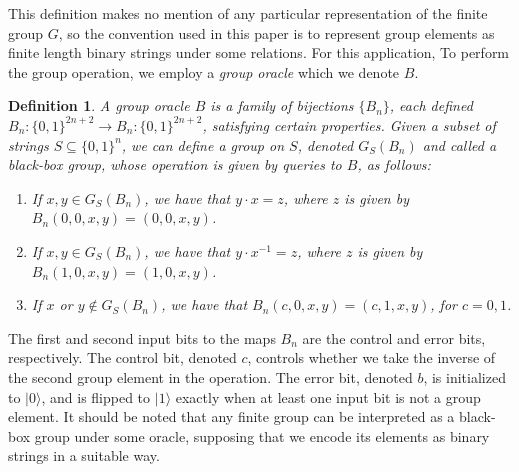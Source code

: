 \documentclass[12pt]{article}
\newtheorem{defn}{Definition}
\numberwithin{thm}{section}
\numberwithin{defn}{section}
\numberwithin{prop}{section}
\numberwithin{rmk}{section}
\newcommand{\ket}[1]{\vert #1 \rangle}
\begin{document}
	This definition makes no mention of any particular representation of the finite group $G$, so the convention used in this paper is to represent group elements as finite length binary strings under some relations. For this application, To perform the group operation, we employ a \textit{group oracle} which we denote $B$. 
	\begin{defn}
		A group oracle $B$ is a family of bijections $\{B_n\}$, each defined $B_n\colon \{0,1\}^{2n+2}\to B_n\colon \{0,1\}^{2n+2}$, satisfying certain properties. Given a subset of strings $S\subseteq \{0,1\}^n$, we can define a group on $S$, denoted $G_S(B_n)$ and called a \textit{black-box group}, whose operation is given by queries to $B$, as follows:
		\begin{enumerate}
			\item If $x,y\in G_S(B_n)$, we have that $y\cdot x=z$, where $z$ is given by $B_n(0,0,x,y)=(0,0,x,y)$.
			\item If $x,y\in G_S(B_n)$, we have that $y\cdot x^{-1}=z$, where $z$ is given by $B_n(1,0,x,y)=(1,0,x,y)$.
			\item If $x$ or $y\notin G_S(B_n)$, we have that $B_n(c,0,x,y)=(c,1,x,y)$, for $c=0,1$.
		\end{enumerate}
	\end{defn}
	The first and second input bits to the maps $B_n$ are the control and error bits, respectively. The control bit, denoted $c$, controls whether we take the inverse of the second group element in the operation. The error bit, denoted $b$, is initialized to $\ket{0}$, and is flipped to $\ket{1}$ exactly when at least one input bit is not a group element. It should be noted that any finite group can be interpreted as a black-box group under some oracle, supposing that we encode its elements as binary strings in a suitable way.\\
	
\end{document}
